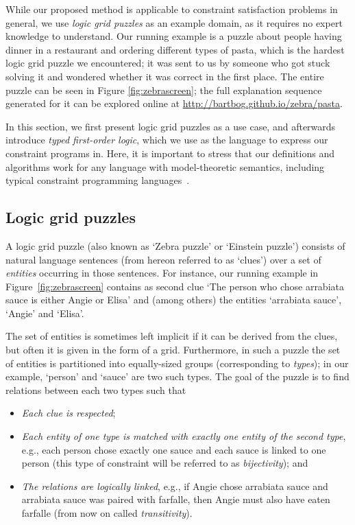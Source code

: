 While our proposed method is applicable to constraint satisfaction problems in general, we use \emph{logic grid puzzles} as an example domain, as it requires no expert knowledge to understand.
Our running example is a puzzle about people having dinner in a restaurant and ordering different types of pasta, which is the hardest logic grid puzzle we encountered; it was sent to us by someone who got stuck solving it and wondered whether it was correct in the first place.    
The entire puzzle can be seen in Figure \ref{fig:zebrascreen}; the full explanation sequence generated for it can be explored online at \url{http://bartbog.github.io/zebra/pasta}.

In this section, we first present logic grid puzzles as a use case, and afterwards introduce \emph{typed first-order logic}, which we use as the language to express our constraint programs in. Here, it is important to stress that our definitions and algorithms work for any language with model-theoretic semantics, including typical constraint programming languages~\cite{rossi2006handbook}.


\subsection{Logic grid puzzles}
A logic grid puzzle (also known as `Zebra puzzle' or `Einstein puzzle') consists of natural language sentences (from hereon referred to as `clues') over a set of \emph{entities} occurring in those sentences. 
For instance, our running example in Figure~\ref{fig:zebrascreen} contains as second clue `The person who chose arrabiata sauce is either Angie or Elisa' and (among others) the entities `arrabiata sauce', `Angie' and `Elisa'. 

The set of entities is sometimes left implicit if it can be derived from the clues, but often it is given in the form of a grid. 
Furthermore, in such a puzzle the set of entities is partitioned into equally-sized groups (corresponding to \emph{types}); in our example, `person' and `sauce' are two such types. 
% 
The goal of the puzzle is to find relations between each two types such that
\begin{itemize}
	\item \emph{Each clue is respected}; 
	\item \emph{Each entity of one type is matched with exactly one entity of the second type}, e.g., each person chose exactly one sauce and each sauce is linked to one person (this type of constraint will be referred to as \emph{bijectivity}); and 
	\item \emph{The relations are logically linked}, e.g., if Angie chose arrabiata sauce and arrabiata sauce was paired with farfalle, then Angie must also have eaten farfalle (from now on called \emph{transitivity}). 
\end{itemize}




